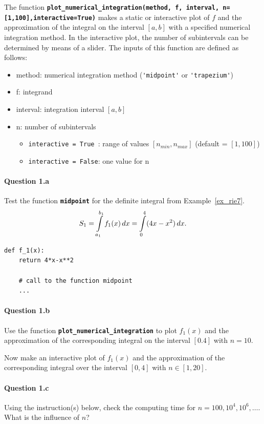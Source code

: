 The function \textbf{\lstinline|plot_numerical_integration(method, f, interval, n=[1,100],interactive=True)|}  makes a static or interactive plot of $f$ 
and the approximation of the integral on the interval $[a,b]$
with a specified numerical integration method. 
In the interactive plot, the number of subintervals can be determined by means of a slider. The inputs of this function are defined as follows:
\begin{itemize}
	\item method: numerical integration method (\lstinline|'midpoint'| or \lstinline|'trapezium'|)
	\item f: integrand
	\item interval: integration interval $[a,b]$
	\item n: number of subintervals
	\begin{itemize}
		\item \lstinline|interactive = True |: range of values $[n_{min},n_{max}]$
		(default = $[1,100]$)
		\item \lstinline|interactive = False|:  one value for n
	\end{itemize}
\end{itemize}


\paragraph{Question 1.a}
Test the function \textbf{\lstinline|midpoint|} for the definite integral from Example~\ref{ex_rie7}. 
$$S_1=\displaystyle\int\limits^{b_1}_{a_1}{f_1(x)}\,dx = \displaystyle\int\limits_0^4 (4x-x^2)\,dx.$$ 
\begin{lstlisting}
def f_1(x):
    return 4*x-x**2
    
    # call to the function midpoint
    ...
\end{lstlisting}


\paragraph{Question 1.b}
Use the function \textbf{\lstinline|plot_numerical_integration|} to plot $f_1(x)$ and the approximation of the corresponding integral on the interval $[0.4]$ with $n = 10$.

Now make an interactive plot of $f_1(x)$ and the approximation of the corresponding integral over the interval $[0,4]$ with $n \in [1, 20]$.


\paragraph{Question 1.c}
Using the instruction(s) below, check the computing time for $n = 100, 10^4, 10^6, \ldots$. What is the influence of $n$?

